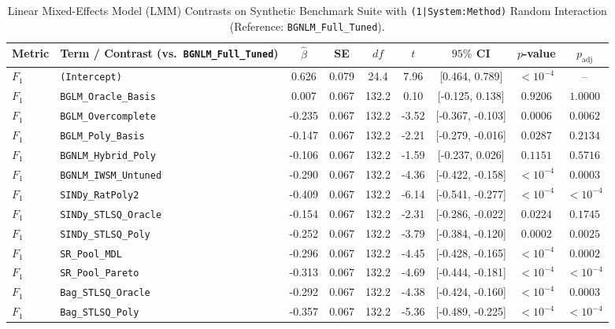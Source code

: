 \begin{table}[t]
\centering
\caption{Linear Mixed-Effects Model (LMM) Contrasts on Synthetic Benchmark Suite with \texttt{(1|System:Method)} Random Interaction (Reference: \texttt{BGNLM\_Full\_Tuned}).}
\label{tab:mixed_effects_synth}
\scriptsize
\setlength{\tabcolsep}{3.5pt}
\renewcommand{\arraystretch}{0.88}
\begin{tabular}{llccccccc}
\toprule
Metric & Term / Contrast (vs.\ \texttt{BGNLM\_Full\_Tuned}) & $\hat{\beta}$ & SE & $df$ & $t$ & $95\%$ CI & $p$-value & $p_{\text{adj}}$ \\
\midrule
$F_1$ & \texttt{(Intercept)} & 0.626 & 0.079 & 24.4 & 7.96 & [0.464, 0.789] & $< 10^{-4}$ & -- \\
$F_1$ & \texttt{BGLM\_Oracle\_Basis} & 0.007 & 0.067 & 132.2 & 0.10 & [-0.125, 0.138] & $0.9206$ & $1.0000$ \\
$F_1$ & \texttt{BGLM\_Overcomplete} & -0.235 & 0.067 & 132.2 & -3.52 & [-0.367, -0.103] & $0.0006$ & $0.0062$ \\
$F_1$ & \texttt{BGLM\_Poly\_Basis} & -0.147 & 0.067 & 132.2 & -2.21 & [-0.279, -0.016] & $0.0287$ & $0.2134$ \\
$F_1$ & \texttt{BGNLM\_Hybrid\_Poly} & -0.106 & 0.067 & 132.2 & -1.59 & [-0.237, 0.026] & $0.1151$ & $0.5716$ \\
$F_1$ & \texttt{BGNLM\_IWSM\_Untuned} & -0.290 & 0.067 & 132.2 & -4.36 & [-0.422, -0.158] & $< 10^{-4}$ & $0.0003$ \\
$F_1$ & \texttt{SINDy\_RatPoly2} & -0.409 & 0.067 & 132.2 & -6.14 & [-0.541, -0.277] & $< 10^{-4}$ & $< 10^{-4}$ \\
$F_1$ & \texttt{SINDy\_STLSQ\_Oracle} & -0.154 & 0.067 & 132.2 & -2.31 & [-0.286, -0.022] & $0.0224$ & $0.1745$ \\
$F_1$ & \texttt{SINDy\_STLSQ\_Poly} & -0.252 & 0.067 & 132.2 & -3.79 & [-0.384, -0.120] & $0.0002$ & $0.0025$ \\
$F_1$ & \texttt{SR\_Pool\_MDL} & -0.296 & 0.067 & 132.2 & -4.45 & [-0.428, -0.165] & $< 10^{-4}$ & $0.0002$ \\
$F_1$ & \texttt{SR\_Pool\_Pareto} & -0.313 & 0.067 & 132.2 & -4.69 & [-0.444, -0.181] & $< 10^{-4}$ & $< 10^{-4}$ \\
$F_1$ & \texttt{Bag\_STLSQ\_Oracle} & -0.292 & 0.067 & 132.2 & -4.38 & [-0.424, -0.160] & $< 10^{-4}$ & $0.0003$ \\
$F_1$ & \texttt{Bag\_STLSQ\_Poly} & -0.357 & 0.067 & 132.2 & -5.36 & [-0.489, -0.225] & $< 10^{-4}$ & $< 10^{-4}$ \\

\end{tabular}
\end{table}
